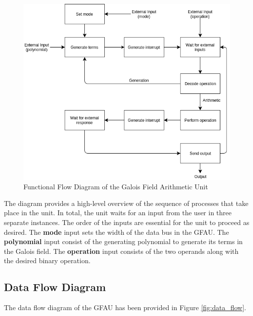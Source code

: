 \documentclass[paper=usletter, fontsize=14pt]{article}
\newcommand{\team}{Galois Field Arithmetic Unit}
\begin{document}
        \begin{figure}[ht]
            \begin{center}
                \includegraphics[width=1\textwidth]{functional_flow.png}
                \caption{Functional Flow Diagram of the \team~} \label{fig:functional_flow}
            \end{center}
        \end{figure}

        The diagram provides a high-level overview of the sequence of processes that take place in the unit. In total, the unit waits for an input from the user in three separate instances. The order of the inputs are essential for the unit to proceed as desired. The \textbf{mode} input sets the width of the data bus in the GFAU. The \textbf{polynomial} input consist of the generating polynomial to generate its terms in the Galois field. The \textbf{operation} input consists of the two operands along with the desired binary operation.
        \newpage

        \subsection{Data Flow Diagram}
        The data flow diagram of the GFAU has been provided in Figure \ref{fig:data_flow}.
\end{document}

